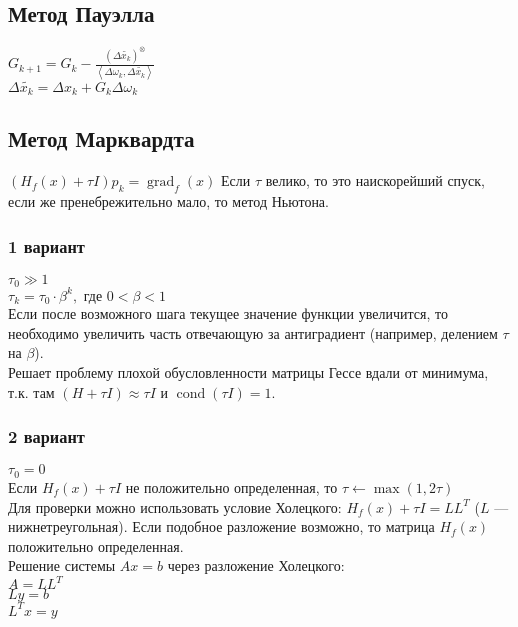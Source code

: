 \documentclass[russian, english]{article}
\newcommand{\mydot}[2]{\left\langle#1,#2\right\rangle}
\begin{document}
\subsection{Метод Пауэлла}
$G_{k+1}=G_k-\frac{(\Delta \tilde{x_k})^\otimes}{\mydot{\Delta\omega_k}{\Delta\tilde{x_k}}}$\\
$\Delta \tilde{x_k} = \Delta x_k + G_k\Delta\omega_k$

\subsection{Метод Марквардта}
$(H_f(x) + \tau I)p_k=\operatorname{grad}_f(x)$
Если $\tau$ велико, то это наискорейший спуск, если же пренебрежительно мало, то метод Ньютона.
\subsubsection{1 вариант}
$\tau_0 \gg 1$\\
$\tau_k = \tau_0\cdot \beta^k, \text{ где } 0 < \beta < 1$\\
Если после возможного шага текущее значение функции увеличится, то необходимо увеличить часть отвечающую за антиградиент (например, делением $\tau$ на $\beta$).\\
Решает проблему плохой обусловленности матрицы Гессе вдали от минимума, т.к. там $(H+\tau I)\approx\tau I$ и $\operatorname{cond}(\tau I) = 1$.
\subsubsection{2 вариант}
$\tau_0 = 0$\\
Если $H_f(x) + \tau I$ не положительно определенная, то $\tau \leftarrow \operatorname{max}(1, 2\tau)$\\
Для проверки можно использовать условие Холецкого: $H_f(x)+\tau I = LL^T$ ($L$ --- нижнетреугольная). Если подобное разложение возможно, то матрица $H_f(x)$ положительно определенная.\\
Решение системы $Ax=b$ через разложение Холецкого:\\
$A=LL^T$\\
$Ly=b$\\
$L^Tx=y$

\newcommand{\MakePlots}{}
\newcommand{\methodsList}{{}}

\newcommand{\ItersLast}[1]{
	\noindent
	\begin{minipage}{\textwidth}
	\begin{center}
	Количество итераций:\\
	\csvautotabular[separator=tab]{#1/iters.tsv}\\
	Последняя точка:\\
	\csvautotabular[separator=tab]{#1/last.tsv}
	\end{center}
	\end{minipage}
}
\end{document}

